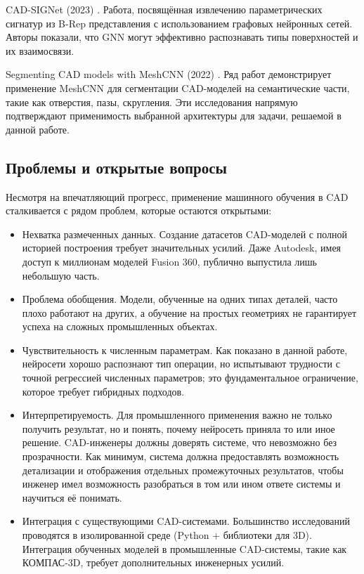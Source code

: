 CAD-SIGNet (2023) \cite{Khan_2024_CVPR}. Работа, посвящённая извлечению параметрических сигнатур из B-Rep представления с использованием графовых нейронных сетей. Авторы показали, что GNN могут эффективно распознавать типы поверхностей и их взаимосвязи.

Segmenting CAD models with MeshCNN (2022) \cite{10908022}. Ряд работ демонстрирует применение MeshCNN для сегментации CAD-моделей на семантические части, такие как отверстия, пазы, скругления. Эти исследования напрямую подтверждают применимость выбранной архитектуры для задачи, решаемой в данной работе.

\subsection{Проблемы и открытые вопросы}

Несмотря на впечатляющий прогресс, применение машинного обучения в CAD сталкивается с рядом проблем, которые остаются открытыми:

\begin{itemize}
    \item Нехватка размеченных данных. Создание датасетов CAD-моделей с полной историей построения требует значительных усилий. Даже Autodesk, имея доступ к миллионам моделей Fusion 360, публично выпустила лишь небольшую часть.
    \item Проблема обобщения. Модели, обученные на одних типах деталей, часто плохо работают на других, а обучение на простых геометриях не гарантирует успеха на сложных промышленных объектах.
    \item Чувствительность к численным параметрам. Как показано в данной работе, нейросети хорошо распознают тип операции, но испытывают трудности с точной регрессией численных параметров; это фундаментальное ограничение, которое требует гибридных подходов.
    \item Интерпретируемость. Для промышленного применения важно не только получить результат, но и понять, почему нейросеть приняла то или иное решение. CAD-инженеры должны доверять системе, что невозможно без прозрачности. Как минимум, система должна предоставлять возможность детализации и отображения отдельных промежуточных результатов, чтобы инженер имел возможность разобраться в том или ином ответе системы и научиться её понимать.
    \item Интеграция с существующими CAD-системами. Большинство исследований проводятся в изолированной среде (Python + библиотеки для 3D). Интеграция обученных моделей в промышленные CAD-системы, такие как КОМПАС-3D, требует дополнительных инженерных усилий.
\end{itemize}

